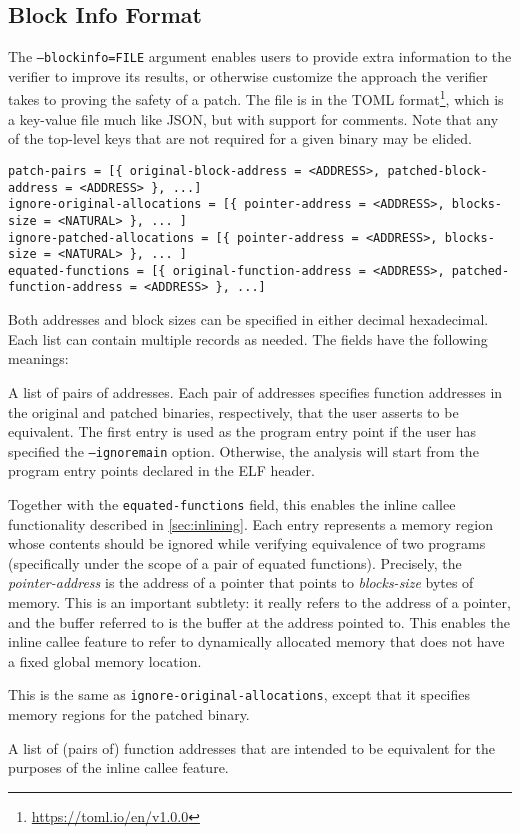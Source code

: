 \subsection{Block Info Format}\label{sec:options:block-info}

The \texttt{--blockinfo=FILE} argument enables users to provide extra information to the verifier to improve its results, or otherwise customize the approach the verifier takes to proving the safety of a patch.  The file is in the TOML format\footnote{\url{https://toml.io/en/v1.0.0}}, which is a key-value file much like JSON, but with support for comments.  Note that any of the top-level keys that are not required for a given binary may be elided.

\begin{lstlisting}
patch-pairs = [{ original-block-address = <ADDRESS>, patched-block-address = <ADDRESS> }, ...]
ignore-original-allocations = [{ pointer-address = <ADDRESS>, blocks-size = <NATURAL> }, ... ]
ignore-patched-allocations = [{ pointer-address = <ADDRESS>, blocks-size = <NATURAL> }, ... ]
equated-functions = [{ original-function-address = <ADDRESS>, patched-function-address = <ADDRESS> }, ...]
\end{lstlisting}

Both addresses and block sizes can be specified in either decimal hexadecimal.  Each list can contain multiple records as needed.  The fields have the following meanings:

\begin{description}[style=nextline]
\item[\texttt{patch-pairs}] A list of pairs of addresses. Each pair of addresses specifies function addresses in the original and patched binaries, respectively, that the user asserts to be equivalent. The first entry is used as the program entry point if the user has specified the \texttt{--ignoremain} option.  Otherwise, the analysis will start from the program entry points declared in the ELF header.
\item[\texttt{ignore-original-allocations}] Together with the \texttt{equated-functions} field, this enables the inline callee functionality described in \cref{sec:inlining}. Each entry represents a memory region whose contents should be ignored while verifying equivalence of two programs (specifically under the scope of a pair of equated functions).  Precisely, the \emph{pointer-address} is the address of a pointer that points to \emph{blocks-size} bytes of memory. This is an important subtlety: it really refers to the address of a pointer, and the buffer referred to is the buffer at the address pointed to. This enables the inline callee feature to refer to dynamically allocated memory that does not have a fixed global memory location.
\item[\texttt{ignore-patched-allocations}] This is the same as \texttt{ignore-original-allocations}, except that it specifies memory regions for the patched binary.
\item[\texttt{equated-functions}] A list of (pairs of) function addresses that are intended to be equivalent for the purposes of the inline callee feature.
\end{description}

